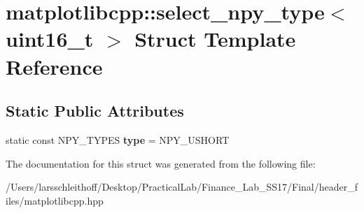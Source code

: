 \hypertarget{structmatplotlibcpp_1_1select__npy__type_3_01uint16__t_01_4}{}\section{matplotlibcpp\+:\+:select\+\_\+npy\+\_\+type$<$ uint16\+\_\+t $>$ Struct Template Reference}
\label{structmatplotlibcpp_1_1select__npy__type_3_01uint16__t_01_4}
\subsection*{Static Public Attributes}
\begin{DoxyCompactItemize}
\item 
\mbox{\label{structmatplotlibcpp_1_1select__npy__type_3_01uint16__t_01_4_aca209b33cc0bcaad16c01bff097a075f}} 
static const N\+P\+Y\+\_\+\+T\+Y\+P\+ES {\bfseries type} = N\+P\+Y\+\_\+\+U\+S\+H\+O\+RT
\end{DoxyCompactItemize}


The documentation for this struct was generated from the following file\+:\begin{DoxyCompactItemize}
\item 
/\+Users/larsschleithoff/\+Desktop/\+Practical\+Lab/\+Finance\+\_\+\+Lab\+\_\+\+S\+S17/\+Final/header\+\_\+files/matplotlibcpp.\+hpp\end{DoxyCompactItemize}
